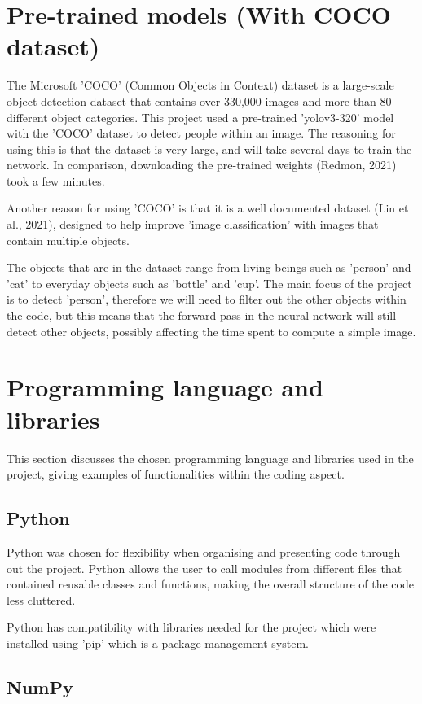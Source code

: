 \documentclass[12pt]{report}
\begin{document}
\section{Pre-trained models (With COCO dataset)}

The Microsoft 'COCO' (Common Objects in Context) dataset is a large-scale object detection dataset that contains over 330,000 images and more than 80 different object categories. This project used a pre-trained 'yolov3-320' model with the 'COCO' dataset to detect people within an image. The reasoning for using this is that the dataset is very large, and will take several days to train the network. In comparison, downloading the pre-trained weights (Redmon, 2021) took a few minutes. 

Another reason for using 'COCO' is that it is a well documented dataset (Lin et al., 2021), designed to help improve 'image classification' with images that contain multiple objects.

The objects that are in the dataset range from living beings such as 'person' and 'cat' to everyday objects such as 'bottle' and 'cup'. The main focus of the project is to detect 'person', therefore we will need to filter out the other objects within the code, but this means that the forward pass in the neural network will still detect other objects, possibly affecting the time spent to compute a simple image. 

\section{Programming language and libraries}

This section discusses the chosen programming language and libraries used in the project, giving examples of functionalities within the coding aspect.

\subsection{Python}

Python was chosen for flexibility when organising and presenting code through out the project. Python allows the user to call modules from different files that contained reusable classes and functions, making the overall structure of the code less cluttered.

Python has compatibility with libraries needed for the project which were installed using 'pip' which is a package management system.

\subsection{NumPy}
\end{document}
